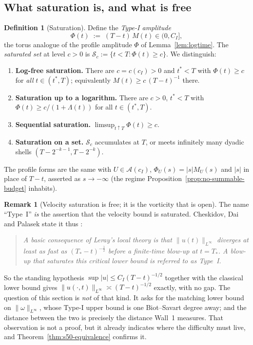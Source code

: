 \documentclass[11pt]{article}
\theoremstyle{definition}
\newtheorem{definition}[theorem]{Definition}
\newtheorem{remark}[theorem]{Remark}
\theoremstyle{remark}
\begin{document}
\subsection{What saturation is, and what is free}
\label{subsec:s50-statement}

\begin{definition}[Saturation]\label{def:s50-saturation}
  Define the \emph{Type-I amplitude}
  \[
    \Phi(t) \;:=\; (T-t)\,M(t) \in (0,C_I],
  \]
  the torus analogue of the profile amplitude $\Phi$ of
  Lemma~\ref{lem:logtime}. The \emph{saturated set} at level $c>0$ is
  $\mathcal{S}_c := \{t<T : \Phi(t)\geq c\}$. We distinguish:
  \begin{enumerate}[label=\textup{(\textbf{Sat-\arabic*})},leftmargin=3.8em]
  \item\label{it:S1} \textbf{Log-free saturation.} There are $c=c(c_I)>0$ and
    $t^*<T$ with $\Phi(t)\geq c$ for \emph{all} $t\in(t^*,T)$; equivalently
    $M(t)\geq c\,(T-t)^{-1}$ there.
  \item\label{it:S2} \textbf{Saturation up to a logarithm.} There are
    $c>0$, $t^*<T$ with $\Phi(t)\geq c/(1+\Lambda(t))$ for all $t\in(t^*,T)$.
  \item\label{it:S3} \textbf{Sequential saturation.}
    $\limsup_{t\uparrow T}\Phi(t)\geq c$.
  \item\label{it:S4} \textbf{Saturation on a set.} $\mathcal{S}_c$ accumulates
    at $T$, or meets infinitely many dyadic shells
    $(T-2^{-k-1},T-2^{-k})$.
  \end{enumerate}
  The profile forms are the same with $U\in\mathcal{A}(c_I)$,
  $\Phi_U(s)=|s|M_U(s)$ and $|s|$ in place of $T-t$, asserted as $s\to-\infty$
  (the regime Proposition~\ref{prop:no-summable-budget} inhabits).
\end{definition}

\begin{remark}[Velocity saturation is free; it is the vorticity that is
  open]\label{rem:s50-velocity-free}
  The name ``Type~I'' \emph{is} the assertion that the velocity bound is
  saturated. Cheskidov, Dai and Palasek state it thus \cite[§2.2]{CDP2026}:
  \begin{quote}\itshape
    A basic consequence of Leray's local theory is that
    $\|u(t)\|_{L^\infty}$ diverges at least as fast as
    $(T_*-t)^{-\frac12}$ before a finite-time blow-up at $t=T_*$. A blow-up
    that saturates this critical lower bound is referred to as Type~I.
  \end{quote}
  So the standing hypothesis $\sup|u|\leq C_I(T-t)^{-1/2}$ together with the
  classical lower bound gives
  $\|u(\cdot,t)\|_{L^\infty}\asymp(T-t)^{-1/2}$ exactly, with no gap. The
  question of this section is \emph{not} of that kind. It asks for the
  matching lower bound on $\|\omega\|_{L^\infty}$, whose Type-I upper bound is
  one Biot--Savart degree away; and the distance between the two is precisely
  the distance Wall~1 measures. That observation is not a proof, but it
  already indicates where the difficulty must live, and
  Theorem~\ref{thm:s50-equivalence} confirms it.
\end{remark}
\end{document}

